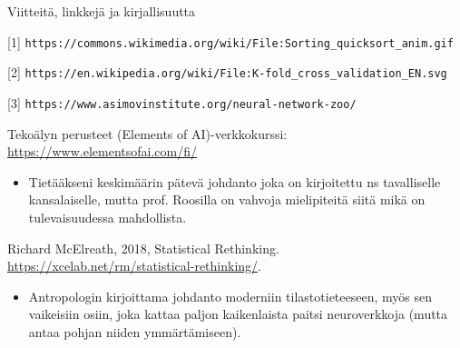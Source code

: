 \documentclass[presentation]{beamer}
\begin{document}
%
%




\begin{frame}{Viitteitä, linkkejä ja kirjallisuutta}

    {\footnotesize
    [1] \texttt{https://commons.wikimedia.org/wiki/File:Sorting\_quicksort\_anim.gif}
    
    [2] \texttt{https://en.wikipedia.org/wiki/File:K-fold\_cross\_validation\_EN.svg}
    
    [3] \texttt{https://www.asimovinstitute.org/neural-network-zoo/}

    
    Tekoälyn perusteet (Elements of AI)-verkkokurssi:  \href{https://www.elementsofai.com/fi/}{https://www.elementsofai.com/fi/} 
    \begin{itemize}
        \item Tietääkseni keskimäärin pätevä johdanto joka on kirjoitettu ns tavalliselle kansalaiselle, mutta prof. Roosilla on vahvoja mielipiteitä siitä mikä on tulevaisuudessa mahdollista.
    \end{itemize}
    
    Richard McElreath, 2018, Statistical Rethinking. \href{https://xcelab.net/rm/statistical-rethinking/}{https://xcelab.net/rm/statistical-rethinking/}.
    \begin{itemize}
        \item Antropologin kirjoittama johdanto moderniin tilastotieteeseen, myös sen vaikeisiin osiin, joka kattaa paljon kaikenlaista paitsi neuroverkkoja (mutta antaa pohjan niiden ymmärtämiseen).
    \end{itemize}
    

    }
\end{frame}
    
\end{document}
